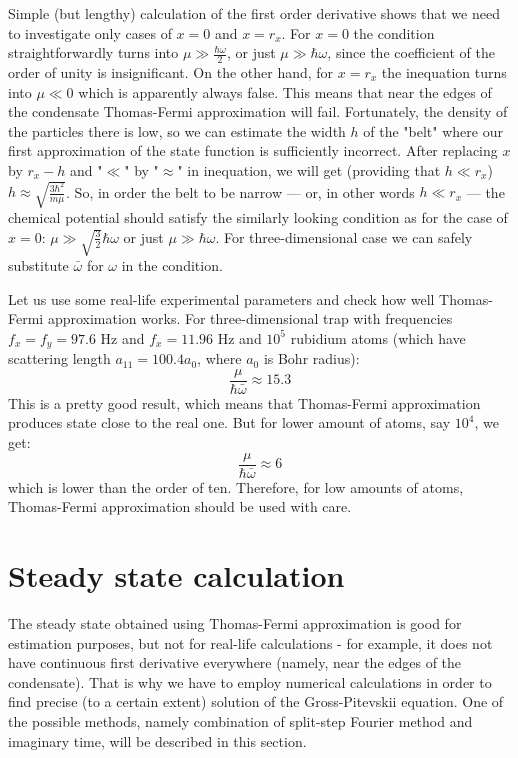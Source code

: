 \documentclass[12pt,notitlepage]{report}
\begin{document}
Simple (but lengthy) calculation of the first order derivative shows that we need to investigate only cases of $x=0$ and
$x=r_x$. For $x=0$ the condition straightforwardly turns into $\mu \gg \frac{\hbar \omega}{2}$, or just
$\mu \gg \hbar \omega$, since the coefficient of the order of unity is insignificant.
On the other hand, for $x=r_x$ the inequation turns into $\mu \ll 0$ which is apparently always false. This means that
near the edges of the condensate Thomas-Fermi approximation will fail. Fortunately, the density of the particles
there is low, so we can estimate the width $h$ of the "belt" where our first approximation of the state function is
sufficiently incorrect. After replacing $x$ by $r_x - h$ and "$\ll$" by "$\approx$" in inequation, we will get (providing that 
$h \ll r_x$) $h \approx \sqrt{\frac{3 \hbar^2}{m \mu}}$. So, in order the belt to be narrow --- or, in other words
$h \ll r_x$ --- the chemical potential should satisfy the similarly looking condition as for the case of $x=0$: 
$\mu \gg \sqrt{\frac{3}{2}} \hbar \omega$ or just $\mu \gg \hbar \omega$. For three-dimensional case we can safely substitute $\bar{\omega}$ for $\omega$ in the condition.

Let us use some real-life experimental parameters and check how well Thomas-Fermi approximation works.
For three-dimensional trap with frequencies $f_x = f_y = 97.6 \textrm{ Hz}$ and $f_x = 11.96 \textrm{ Hz}$ and
$10^5$ rubidium atoms (which have scattering length $a_{11} = 100.4 a_0$, where $a_0$ is Bohr radius):
\[ \frac{\mu}{\hbar \bar{\omega}} \approx 15.3 \]
This is a pretty good result, which means that Thomas-Fermi approximation produces state close to the real one.
But for lower amount of atoms, say $10^4$, we get:
\[ \frac{\mu}{\hbar \bar{\omega}} \approx 6 \]
which is lower than the order of ten. Therefore, for low amounts of atoms, Thomas-Fermi approximation should be
used with care. 

\section*{Steady state calculation}

The steady state obtained using Thomas-Fermi approximation is good for estimation purposes, but not for
real-life calculations - for example, it does not have continuous first derivative everywhere (namely,
near the edges of the condensate). That is why we have to employ numerical calculations in order
to find precise (to a certain extent) solution of the Gross-Pitevskii equation. One of the possible methods, 
namely combination of split-step Fourier method and imaginary time, will be described in this section.
\end{document}
